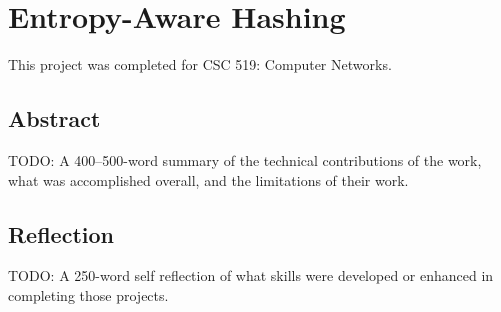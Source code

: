 \section{Entropy-Aware Hashing}

This project was completed for CSC 519: Computer Networks.

\subsection{Abstract}

TODO: A 400–500-word summary of the technical contributions of the work, what was
accomplished overall, and the limitations of their work.

\subsection{Reflection}

TODO: A 250-word self reflection of what skills were developed or enhanced in completing those
projects.